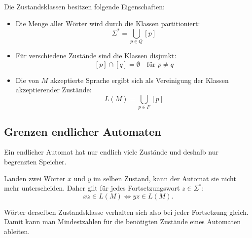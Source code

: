 Die Zustandsklassen besitzen folgende Eigenschaften:
\begin{itemize}
    \item Die Menge aller Wörter wird durch die Klassen partitioniert:
    \[
    \Sigma^* = \bigcup_{p \in Q} [p]
    \]
    \item Für verschiedene Zustände sind die Klassen disjunkt:
    \[
    [p] \cap [q] = \emptyset \quad \text{für } p \ne q
    \]
    \item Die von $M$ akzeptierte Sprache ergibt sich als Vereinigung der Klassen akzeptierender Zustände:
    \[
    L(M) = \bigcup_{p \in F} [p]
    \]
\end{itemize}

\subsection*{Grenzen endlicher Automaten}
Ein endlicher Automat hat nur endlich viele Zustände und deshalb nur begrenzten Speicher.

Landen zwei Wörter $x$ und $y$ im selben Zustand, kann der Automat sie nicht mehr unterscheiden. Daher gilt für jedes Fortsetzungswort $z \in \Sigma^*$:
\[
xz \in L(M) \iff yz \in L(M).
\]

Wörter derselben Zustandsklasse verhalten sich also bei jeder Fortsetzung gleich.
Damit kann man Mindestzahlen für die benötigten Zustände eines Automaten ableiten.
